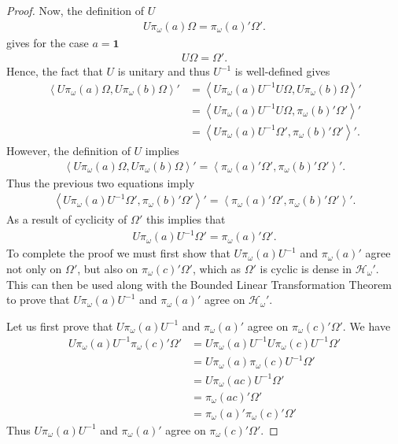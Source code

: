 \begin{proof}
Now, the definition of $U$
\begin{align}
    U\pi_\omega(a)\Omega = \pi_\omega(a)'\Omega'.
\end{align}
gives for the case $a = \mathbf{1}$
\begin{align}
    U\Omega = \Omega'.
\end{align}
Hence, the fact that $U$ is unitary and thus $U^{-1}$ is well-defined gives
\begin{align}
    \left< U\pi_\omega(a)\Omega, U\pi_\omega(b)\Omega \right>' &= \left< U\pi_\omega(a)U^{-1}U\Omega, U\pi_\omega(b)\Omega \right>' \\
                                                               &= \left< U\pi_\omega(a)U^{-1}U\Omega, \pi_\omega(b)'\Omega' \right>' \\
                                                               &= \left< U\pi_\omega(a)U^{-1}\Omega', \pi_\omega(b)'\Omega' \right>'.
\end{align}
However, the definition of $U$ implies
\begin{align}
    \left< U\pi_\omega(a)\Omega, U\pi_\omega(b)\Omega \right>' = \left<\pi_\omega(a)'\Omega', \pi_\omega(b)'\Omega'\right>'.
\end{align}
Thus the previous two equations imply
\begin{align}
    \left< U\pi_\omega(a)U^{-1}\Omega', \pi_\omega(b)'\Omega' \right>' = \left<\pi_\omega(a)'\Omega', \pi_\omega(b)'\Omega'\right>'.
\end{align}
As a result of cyclicity of $\Omega'$ this implies that
\begin{align}
    U\pi_\omega(a)U^{-1}\Omega' = \pi_\omega(a)'\Omega'.
\end{align}
To complete the proof we must first show that $U\pi_\omega(a)U^{-1}$ and $\pi_\omega(a)'$ agree not only on $\Omega'$, but also on $\pi_\omega(c)'\Omega'$, which as $\Omega'$ is cyclic is dense in $\mathcal{H}_\omega'$. This can then be used along with the Bounded Linear Transformation Theorem to prove that $U\pi_\omega(a)U^{-1}$ and $\pi_\omega(a)'$ agree on $\mathcal{H}_\omega'$.

Let us first prove that $U\pi_\omega(a)U^{-1}$ and $\pi_\omega(a)'$ agree on $\pi_\omega(c)'\Omega'$. We have
\begin{align}
    U\pi_\omega(a)U^{-1} \pi_\omega(c)'\Omega' &= U\pi_\omega(a)U^{-1} U\pi_\omega(c)U^{-1} \Omega' \\
                                               &= U\pi_\omega(a)\pi_\omega(c)U^{-1} \Omega' \\
                                               &= U\pi_\omega(ac)U^{-1} \Omega' \\
                                               &= \pi_\omega(ac)' \Omega' \\
                                               &= \pi_\omega(a)'\pi_\omega(c)' \Omega'
\end{align}
Thus $U\pi_\omega(a)U^{-1}$ and $\pi_\omega(a)'$ agree on $\pi_\omega(c)'\Omega'$.


\end{proof}

